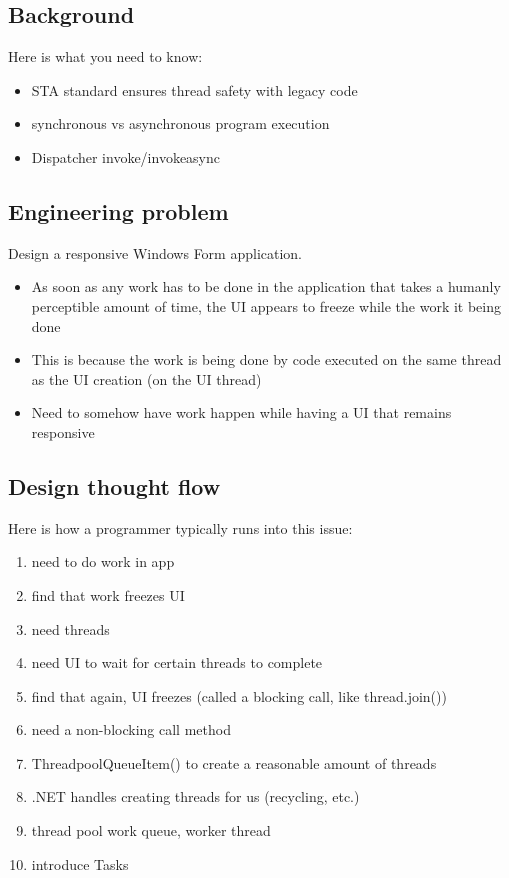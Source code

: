 \documentclass[11pt, a4paper]{article}
\begin{document}
\subsection{Background}
Here is what you need to know:
\begin{itemize}
    \item STA standard
        \subitem ensures thread safety with legacy code
    \item synchronous vs asynchronous program execution
    \item Dispatcher invoke/invokeasync
\end{itemize}
\subsection{Engineering problem}
Design a responsive Windows Form application.
\begin{itemize}
    \item As soon as any work has to be done in the application that takes a humanly perceptible amount of time, the UI appears to freeze while the work it being done
    \item This is because the work is being done by code executed on the same thread as the UI creation (on the UI thread)
    \item Need to somehow have work happen while having a UI that remains responsive
\end{itemize}
\subsection{Design thought flow}
Here is how a programmer typically runs into this issue:
\begin{enumerate}
    \item need to do work in app
    \item find that work freezes UI
    \item need threads
    \item need UI to wait for certain threads to complete
    \item find that again, UI freezes (called a blocking call, like thread.join())
    \item need a non-blocking call method
    \item ThreadpoolQueueItem() to create a reasonable amount of threads
    \item .NET handles creating threads for us (recycling, etc.)
    \item thread pool work queue, worker thread
    \item introduce Tasks
\end{enumerate}
\end{document}
